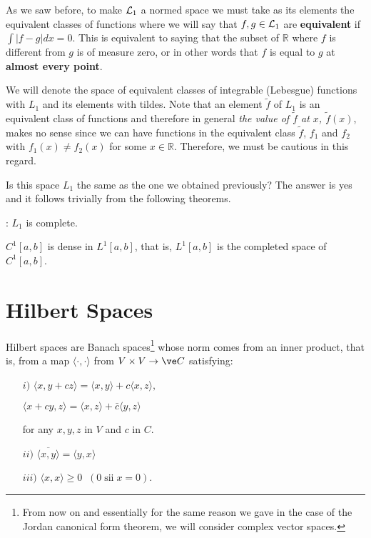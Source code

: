 As we saw before, to make ${\cal L}_1$ a normed space we must
take as its elements the equivalent classes of functions where 
we will say that $f, g \in {\cal L}_1$ are {\bf equivalent} if 
$\int |f - g| dx = 0$. This is equivalent to saying that the subset 
of $\mathbb{R}$ where $f$ is different from $g$ is of measure zero, or in other
words that $f$ is equal to $g$ at {\bf almost every point}.

We will denote the space of equivalent classes of
integrable (Lebesgue) functions with $L_1$ and its elements with tildes.
Note that an element $\tilde{f}$ of $L_1$ is an equivalent class of
functions and therefore in general {\it the value of $\tilde{f}$ at $x$,
$\tilde{f}(x)$}, makes no sense since we can have functions in the
equivalent class $\tilde{f}$, $f_1$ and $f_2$ with $f_1(x) \neq f_2(x)$
for some $x \in \mathbb{R}$. Therefore, we must be cautious in this regard.

Is this space $L_1$ the same as the one we obtained previously? 
The answer is yes and it follows trivially from the following theorems.

: 
$L_1$ is complete.
\eteo

\bteo
$C^1[a, b]$ is dense in $L^1[a, b]$, that is, $L^1[a, b]$
is the completed space of $C^1[a, b]$.
\eteo

\section{Hilbert Spaces}

Hilbert spaces are Banach spaces\footnote{
From now on and essentially for the same reason we gave in the case of the Jordan canonical form theorem, we will consider complex vector spaces.} whose norm comes from an inner product, that is, from a map $\langle \cdot,\cdot \rangle $ from 
$V \times V \rightarrow \ve C$ 
satisfying:
\begin{itemize}
\item[$i)$]$ \langle x,y+cz \rangle = \langle x,y \rangle +c \langle x,z \rangle, $
               
               $ \langle x+cy,z \rangle = \langle x,z \rangle + \bar c \langle y,z\rangle $
               
\noi for any $x,y,z$ in $V$ and $c$ in $C$.

\item[$ii)$] $ \overline{\langle x,y \rangle} = \langle y,x \rangle $

\item[$iii)$] $ \langle x,x \rangle \geq 0 \;\; (0\;\mbox{sii}\; x=0). $

\end{itemize}

